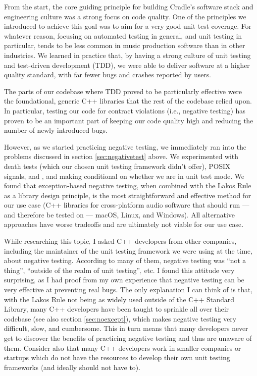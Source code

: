 From the start, the core guiding principle for building Cradle's software stack and engineering culture was a strong focus on code quality. One of the principles we introduced to achieve this goal was to aim for a very good unit test coverage. For whatever reason, focusing on automated testing in general, and unit testing in particular, tends to be less common in  music production software than in other industries. We learned in practice that, by having a strong culture of unit testing and test-driven development (TDD), we were able to deliver software at a higher quality standard, with far fewer bugs and crashes reported by users.

The parts of our codebase where TDD proved to be particularly effective were the foundational, generic C++ libraries that the rest of the codebase relied upon. In particular, testing our code for contract violations (i.e., negative testing) has proven to be an important part of keeping our code quality high and reducing the number of newly introduced bugs. 

However, as we started practicing negative testing, we immediately ran into the problems discussed in section \ref{sec:negativetest} above. We experimented with death tests (which our chosen unit testing framework didn't offer), POSIX signals,  and , and making  conditional on whether we are in unit test mode. We found that exception-based negative testing, when combined with the Lakos Rule as a library design principle, is the most straightforward and effective method for our use case (C++ libraries for cross-platform audio software that should run --- and therefore be tested on --- macOS, Linux, and Windows). All alternative approaches have worse tradeoffs and are ultimately not viable for our use case.

While researching this topic, I asked C++ developers from other companies, including the maintainer of the unit testing framework we were using at the time, about negative testing. According to many of them, negative testing was ``not a thing'', ``outside of the realm of unit testing'', etc. I found this attitude very surprising, as I had proof from my own experience that negative testing can be very effective at preventing real bugs. The only explanation I can think of is that, with the Lakos Rule not being as widely used outside of the C++ Standard Library, many C++ developers have been taught to sprinkle  all over their codebase (see also section \ref{sec:noexcept}), which makes negative testing very difficult, slow, and cumbersome. This in turn means that many developers never get to discover the benefits of practicing negative testing and thus are unaware of them. Consider also that many C++ developers work in smaller companies or startups which do not have the resources to develop their own unit testing frameworks (and ideally should not have to).

